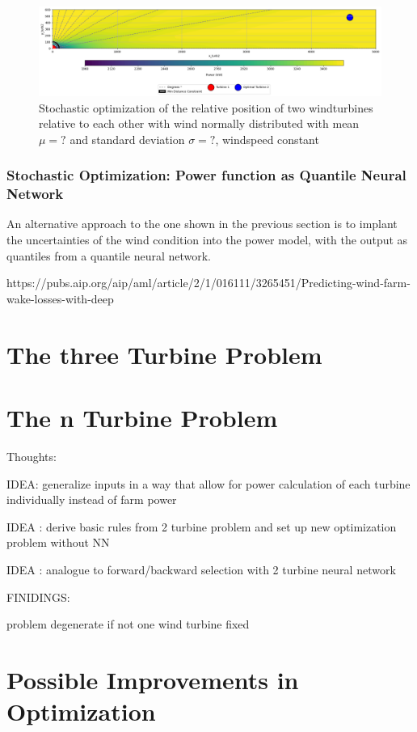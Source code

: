 \begin{figure}[h] 
	\centering
	\includegraphics[width=1\textwidth]{figures/optimization/probabilistc_scenarios.png} 
	\caption{Stochastic optimization of the relative position of two windturbines relative to each other with wind normally distributed with mean $\mu = ?$ and standard deviation $\sigma = ?$, windspeed constant}
	\label{fig:two_turbine_heatmap_degeneracy}
\end{figure}
	
	
\subsubsection{Stochastic Optimization:  Power function as Quantile Neural Network}

An alternative approach to the one shown in the previous section is to implant the uncertainties of the wind condition into the power model, with the output as quantiles from a quantile neural network. 


https://pubs.aip.org/aip/aml/article/2/1/016111/3265451/Predicting-wind-farm-wake-losses-with-deep

	

\section{The three Turbine Problem}

\section{The n Turbine Problem}

Thoughts: 

IDEA: generalize inputs in a way that allow for power calculation of each turbine individually instead of farm power

IDEA : derive basic rules from 2 turbine problem and set up new optimization problem without NN 

IDEA : analogue to forward/backward selection with 2 turbine neural network


FINIDINGS: 

problem degenerate if not one wind turbine fixed

\section{Possible Improvements in Optimization}
